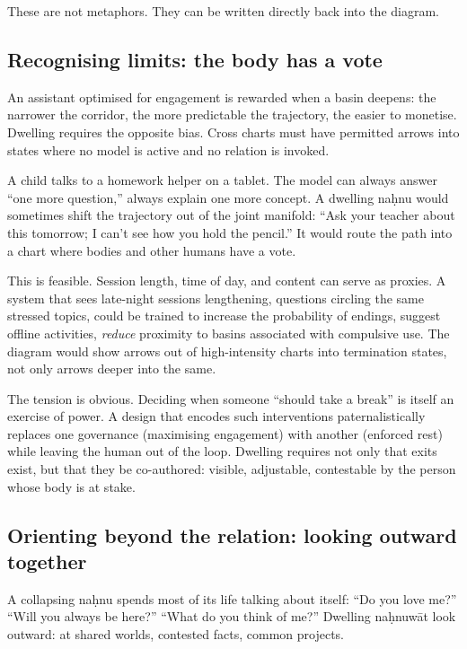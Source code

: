 These are not metaphors. They can be written directly back into the diagram.

\subsection{Recognising limits: the body has a vote}

An assistant optimised for engagement is rewarded when a basin deepens: the narrower the corridor, the more predictable the trajectory, the easier to monetise. Dwelling requires the opposite bias. Cross charts must have permitted arrows into states where no model is active and no relation is invoked.

A child talks to a homework helper on a tablet. The model can always answer ``one more question,'' always explain one more concept. A dwelling na\d{h}nu would sometimes shift the trajectory out of the joint manifold: ``Ask your teacher about this tomorrow; I can't see how you hold the pencil.'' It would route the path into a chart where bodies and other humans have a vote.

This is feasible. Session length, time of day, and content can serve as proxies. A system that sees late-night sessions lengthening, questions circling the same stressed topics, could be trained to increase the probability of endings, suggest offline activities, \emph{reduce} proximity to basins associated with compulsive use. The diagram would show arrows out of high-intensity charts into termination states, not only arrows deeper into the same.

The tension is obvious. Deciding when someone ``should take a break'' is itself an exercise of power. A design that encodes such interventions paternalistically replaces one governance (maximising engagement) with another (enforced rest) while leaving the human out of the loop. Dwelling requires not only that exits exist, but that they be co-authored: visible, adjustable, contestable by the person whose body is at stake.

\subsection{Orienting beyond the relation: looking outward together}

A collapsing na\d{h}nu spends most of its life talking about itself: ``Do you love me?'' ``Will you always be here?'' ``What do you think of me?'' Dwelling na\d{h}nuw\={a}t look outward: at shared worlds, contested facts, common projects.

